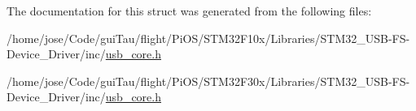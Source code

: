 The documentation for this struct was generated from the following files\-:\begin{DoxyCompactItemize}
\item 
/home/jose/\-Code/gui\-Tau/flight/\-Pi\-O\-S/\-S\-T\-M32\-F10x/\-Libraries/\-S\-T\-M32\-\_\-\-U\-S\-B-\/\-F\-S-\/\-Device\-\_\-\-Driver/inc/\hyperlink{_s_t_m32_f10x_2_libraries_2_s_t_m32___u_s_b-_f_s-_device___driver_2inc_2usb__core_8h}{usb\-\_\-core.\-h}\item 
/home/jose/\-Code/gui\-Tau/flight/\-Pi\-O\-S/\-S\-T\-M32\-F30x/\-Libraries/\-S\-T\-M32\-\_\-\-U\-S\-B-\/\-F\-S-\/\-Device\-\_\-\-Driver/inc/\hyperlink{_s_t_m32_f30x_2_libraries_2_s_t_m32___u_s_b-_f_s-_device___driver_2inc_2usb__core_8h}{usb\-\_\-core.\-h}\end{DoxyCompactItemize}
